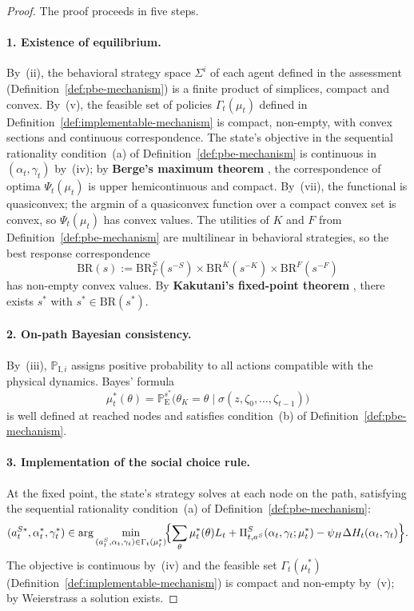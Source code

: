 \documentclass[12pt]{article}
\numberwithin{equation}{section}
\numberwithin{table}{section}
\theoremstyle{definition}
\newcommand{\ProbE}{\mathbb{P}_{\mathrm{E}}}
\newcommand{\ProbI}[1]{\mathbb{P}_{\mathrm{I},#1}}
\begin{document}
\begin{proof}
The proof proceeds in five steps.

\paragraph{1. Existence of equilibrium.}
By~(ii), the behavioral strategy space $\Sigma^i$ of each agent defined in the assessment (Definition~\ref{def:pbe-mechanism}) is a finite
product of simplices, compact and convex. By~(v), the feasible set of policies $\Gamma_t(\mu_t)$ defined in Definition~\ref{def:implementable-mechanism}
is compact, non-empty, with convex sections and continuous
correspondence. The state's objective in the sequential rationality condition~(a) of Definition~\ref{def:pbe-mechanism} is continuous in $(\alpha_t,\gamma_t)$
by~(iv); by \textbf{Berge's maximum theorem} \citep{AliprantisBorder2006}, the
correspondence of optima $\Psi_t(\mu_t)$ is upper hemicontinuous and compact.
By~(vii), the functional is quasiconvex; the argmin of a quasiconvex function
over a compact convex set is convex, so $\Psi_t(\mu_t)$ has convex values. The
utilities of $K$ and $F$ from Definition~\ref{def:pbe-mechanism} are multilinear in behavioral strategies, so the best
response correspondence
\[
\mathrm{BR}(s)
:=\mathrm{BR}^S_\Gamma(s^{-S})\times\mathrm{BR}^K(s^{-K})
  \times\mathrm{BR}^F(s^{-F})
\]
has non-empty convex values. By \textbf{Kakutani's fixed-point theorem}
\citep{Kakutani1941}, there exists $s^\ast$ with
$s^\ast\in\mathrm{BR}(s^\ast)$.

\paragraph{2. On-path Bayesian consistency.}
By~(iii), $\ProbI{i}$ assigns positive probability to all actions compatible
with the physical dynamics. Bayes' formula
\[
\mu_t^\ast(\theta)
=\ProbE^{s^\ast}\!\bigl(\theta_K=\theta\mid\sigma(z,\zeta_0,\ldots,\zeta_{t-1})\bigr)
\]
is well defined at reached nodes and satisfies condition~(b) of
Definition~\ref{def:pbe-mechanism}.

\paragraph{3. Implementation of the social choice rule.}
At the fixed point, the state's strategy solves at each node on the path, satisfying the sequential rationality condition~(a) of Definition~\ref{def:pbe-mechanism}:
\[
(a_t^{S\ast},\alpha_t^\ast,\gamma_t^\ast)
\in\arg\min_{(a_t^S,\alpha_t,\gamma_t)\in\Gamma_t(\mu_t^\ast)}
\!\Bigl\{\sum_\theta\mu_t^\ast(\theta)L_t
+\Pi_{t,a^S}^S(\alpha_t,\gamma_t;\mu_t^\ast)
-\psi_H\Delta H_t(\alpha_t,\gamma_t)\Bigr\}.
\]
The objective is continuous by~(iv) and the feasible set $\Gamma_t(\mu_t^\ast)$ (Definition~\ref{def:implementable-mechanism}) is compact and
non-empty by~(v); by Weierstrass a solution exists.


\end{proof}
\end{document}
